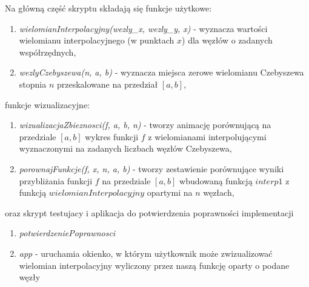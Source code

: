 \documentclass{article}
\begin{document}
	Na główną część skryptu składają się funkcje użytkowe:
	\begin{enumerate}
		\item \textit{wielomianInterpolacyjny(wezly\_x, wezly\_y, x)} - wyznacza wartości wielomianu interpolacyjnego (w punktach $x$) dla węzłów o zadanych współrzędnych,
		\item \textit{wezlyCzebyszewa(n, a, b)} - wyznacza miejsca zerowe		wielomianu Czebyszewa stopnia $n$ przeskalowane na przedział $[a, b]$,
	\end{enumerate}
	funkcje wizualizacyjne:
	\begin{enumerate}
		\item \textit{wizualizacjaZbieznosci(f, a, b, n)} - tworzy animację porównującą na przedziale $[a, b]$
		wykres funkcji $f$ z wielomianami interpolującymi wyznaczonymi na zadanych
		liczbach węzłów Czebyszewa,
		\item \textit{porownajFunkcje(f, x, n, a, b)} - tworzy zestawienie porównujące wyniki przybliżania funkcji $f$ na przedziale $[a, b]$  wbudowaną funkcją $interp1$ z funkcją $wielomianInterpolacyjny$ opartymi na $n$ węzłach,
	\end{enumerate}
	oraz skrypt testujacy i aplikacja do potwierdzenia poprawności implementacji
	\begin{enumerate}
		\item \textit{potwierdzeniePoprawnosci}
		\item \textit{app} - uruchamia okienko, w którym użytkownik może zwizualizować wielomian interpolacyjny wyliczony przez naszą funkcję oparty o podane węzły
	\end{enumerate}
\end{document}
